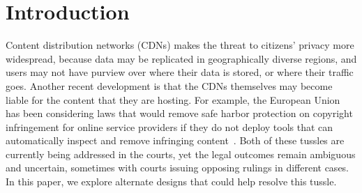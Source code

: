 \section{Introduction}
\label{sec:intro}


Content distribution networks (CDNs) makes the threat to citizens'
privacy more widespread, because data may be replicated in geographically
diverse regions, and users may not have purview over where their data is
stored, or where their traffic goes. Another recent development is that the
CDNs themselves may become liable for the content that they are hosting. For
example, the European Union has been considering laws that would remove safe
harbor protection on copyright infringement for online service providers if
they do not deploy tools that can automatically inspect and remove infringing
content~\cite{eu-copyright}. Both of these tussles are currently being
addressed in the courts, yet the legal outcomes remain ambiguous and
uncertain, sometimes with courts issuing opposing rulings in different cases.
In this paper, we explore alternate designs that could help
resolve this tussle.


